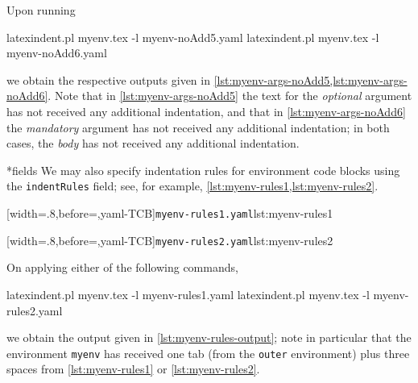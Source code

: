 	Upon running
	\begin{commandshell}
latexindent.pl myenv.tex -l myenv-noAdd5.yaml  
latexindent.pl myenv.tex -l myenv-noAdd6.yaml  
\end{commandshell}
	we obtain the respective outputs given in \cref{lst:myenv-args-noAdd5,lst:myenv-args-noAdd6}. Note that in \cref{lst:myenv-args-noAdd5}
	the text for the \emph{optional} argument has not received any additional indentation, and that in \cref{lst:myenv-args-noAdd6} the
	\emph{mandatory} argument has not received any additional indentation; in both cases, the \emph{body} has not received any additional indentation.

	\begin{minipage}{.45\textwidth}
	\end{minipage}
	\hfill
	\begin{minipage}{.45\textwidth}
	\end{minipage}

*{fields}
	We may also specify indentation rules for environment code blocks using the \texttt{indentRules} field; see, for example,
	\cref{lst:myenv-rules1,lst:myenv-rules2}.

	\begin{minipage}{.45\textwidth}
		[width=.8\linewidth,before=\centering,yaml-TCB]{\texttt{myenv-rules1.yaml}}{lst:myenv-rules1}
	\end{minipage}
	\hfill
	\begin{minipage}{.45\textwidth}
		[width=.8\linewidth,before=\centering,yaml-TCB]{\texttt{myenv-rules2.yaml}}{lst:myenv-rules2}
	\end{minipage}

	On applying either of the following commands,
	\begin{commandshell}
latexindent.pl myenv.tex -l myenv-rules1.yaml  
latexindent.pl myenv.tex -l myenv-rules2.yaml  
\end{commandshell}
	we obtain the output given in \cref{lst:myenv-rules-output}; note in particular that the environment \texttt{myenv}
    has received one tab (from the \texttt{outer} environment) plus three spaces from \cref{lst:myenv-rules1} or \ref{lst:myenv-rules2}.

